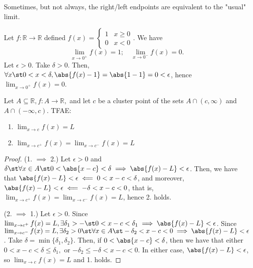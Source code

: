 \documentclass[12pt]{article}
\begin{document}
\begin{remark}
  Sometimes, but not always, the right/left endpoints are equivalent to the "usual" limit.
\end{remark}

\begin{example}
  Let $f: \mathbb{R} \to \mathbb{R}$ defined $f(x) = \begin{cases}
    1 & x \geq 0\\
    0 & x < 0
  \end{cases}$. We have \[\lim_{x\to 0^+} f(x) = 1; \quad \lim_{x\to 0^-} f(x) = 0.\]
  Let $\epsilon > 0$. Take $\delta > 0$. Then, $\forall x \st 0 < x < \delta, \abs{f(x) - 1} = \abs{1 - 1} =  0 < \epsilon$, hence $\lim_{x\to 0^+} f(x) = 0$. %

\end{example}

\begin{proposition}\label{prop:leftrightequiv}
  Let $A \subseteq \mathbb{R}, f : A \to \mathbb{R},$ and let $c$ be a cluster point of the sets $A \cap (c, \infty)$ and  $A \cap (-\infty, c)$. TFAE:
  \begin{enumerate}
    \item $\lim_{x\to c} f(x) = L$
    \item $\lim_{x\to c^+} f(x) = \lim_{x \to c^-} f(x) = L$
  \end{enumerate}
\end{proposition}

\begin{proof}
  (1. $\implies$ 2.) Let $\epsilon > 0$ and $\delta \st \forall x \in A \st 0 < \abs{x - c} < \delta \implies \abs{f(x) - L} < \epsilon$. Then, we have that $\abs{f(x) - L} < \epsilon \impliedby 0 < x - c < \delta$, and moreover, $\abs{f(x) - L} < \epsilon \impliedby -\delta < x - c < 0$, that is, $\lim_{x\to c^+} f(x) = \lim_{x \to c^-} f(x) = L$, hence 2. holds.

  \noindent (2. $\implies$ 1.) Let $\epsilon > 0$. Since $\lim_{x\to c^+} f(x) = L, \exists \delta_1 > - \st 0 < x - c < \delta_1 \implies \abs{f(x) - L} < \epsilon$. Since $\lim_{x\to c^-} f(x) = L, \exists \delta_2 > 0 \st \forall x \in A \st - \delta_2 < x - c < 0 \implies \abs{f(x) - L} < \epsilon$. Take $\delta = \min \{\delta_1, \delta_2\}$. Then, if $0 < \abs{x - c} < \delta$, then we have that either $0 < x - c < \delta \leq \delta_1,$ or $- \delta_2 \leq - \delta < x - c < 0$. In either case, $\abs{f(x) - L} < \epsilon$, so $\lim_{x\to c}f(x) = L$ and 1. holds. 
\end{proof}
\end{document}
